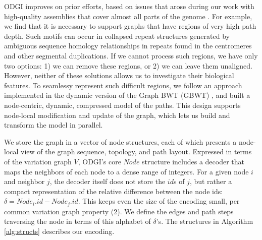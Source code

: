 \documentclass{bioinfo}
\begin{document}
ODGI improves on prior efforts, based on issues that arose during our work with high-quality assemblies that cover almost all parts of the genome \citep{Logsdon_2021,Nurk_2021}.
For example, we find that it is necessary to support graphs that have regions of very high path depth.
Such motifs can occur in collapsed repeat structures generated by ambiguous sequence homology relationships in repeats found in the centromeres and other segmental duplications.
If we cannot process such regions, we have only two options: 1) we can remove these regions, or 2) we can leave them unaligned. However, neither of these solutions allows us to investigate their biological features.
To seamlessy represent such difficult regions, we follow an approach implemented in the dynamic version of the Graph BWT (GBWT) \citep{Siren:2020}, and built a node-centric, dynamic, compressed model of the paths.
This design supports node-local modification and update of the graph, which lets us build and transform the model in parallel.

We store the graph in a vector of node structures, each of which presents a node-local view of the graph sequence, topology, and path layout.
Expressed in terms of the variation graph $V$, ODGI's core $Node$ structure includes a decoder that maps the neighbors of each node to a dense range of integers.
For a given node $i$ and neighbor $j$, the decoder itself does not store the $id$s of $j$, but rather a compact representation of the relative difference between the node ids: $\delta = Node_i.id - Node_j.id$.
This keeps even the size of the encoding small, per common variation graph property (2).
We define the edges and path steps traversing the node in terms of this alphabet of $\delta$'s.
The structures in Algorithm \ref{alg:structs} describes our encoding.
\end{document}

